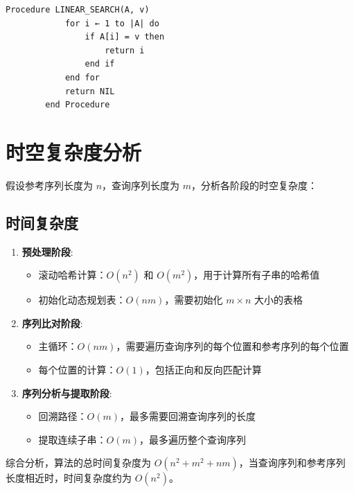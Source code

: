\documentclass[12pt, a4paper, oneside]{ctexart}
\begin{document}
        \begin{lstlisting}[language=Algol, basicstyle=\small\ttfamily]
        Procedure LINEAR_SEARCH(A, v)
            for i ← 1 to |A| do
                if A[i] = v then
                    return i
                end if
            end for
            return NIL              
        end Procedure
        \end{lstlisting}

    \section{时空复杂度分析}
    
    假设参考序列长度为 $n$，查询序列长度为 $m$，分析各阶段的时空复杂度：
    
    \subsection{时间复杂度}
    
    \begin{enumerate}
        \item \textbf{预处理阶段}: 
        \begin{itemize}
            \item 滚动哈希计算：$O(n^2)$ 和 $O(m^2)$，用于计算所有子串的哈希值
            \item 初始化动态规划表：$O(nm)$，需要初始化 $m \times n$ 大小的表格
        \end{itemize}
        
        \item \textbf{序列比对阶段}: 
        \begin{itemize}
            \item 主循环：$O(nm)$，需要遍历查询序列的每个位置和参考序列的每个位置
            \item 每个位置的计算：$O(1)$，包括正向和反向匹配计算
        \end{itemize}
        
        \item \textbf{序列分析与提取阶段}: 
        \begin{itemize}
            \item 回溯路径：$O(m)$，最多需要回溯查询序列的长度
            \item 提取连续子串：$O(m)$，最多遍历整个查询序列
        \end{itemize}
    \end{enumerate}
    
    综合分析，算法的总时间复杂度为 $O(n^2 + m^2 + nm)$，当查询序列和参考序列长度相近时，时间复杂度约为 $O(n^2)$。
    
\end{document}
